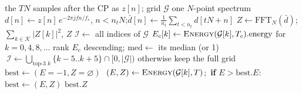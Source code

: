 \begin{algorithm}[H]
\caption{\textsc{Accumulate}, ROBUST and EXTREME: gated two-stage frequency search (\texttt{\_demodulate\_freq\_search}).}
\label{alg:acc_search}
\begin{algorithmic}[1]
\Require the $TN$ samples after the CP as $z[n]$; grid $\mathcal{G}$
\Ensure one $N$-point spectrum
 
    \State $d[n] \gets z[n]\, e^{-2\pi j f n / f_s}$, $n < n_t N$;\quad $\bar d[n] \gets \frac{1}{n_t}\sum_{t < n_t} d[tN + n]$
    \State $Z \gets \mathrm{FFT}_N(\bar d)$;\quad \Return $\sum_{k \in \mathcal{K}} |Z[k]|^2$, $Z$
\EndFunction
\State $\mathcal{I} \gets$ all indices of $\mathcal{G}$
 
    \State $E_c[k] \gets \textsc{Energy}(\mathcal{G}[k], T_c).\mathrm{energy}$ for $k = 0, 4, 8, \ldots$ 
    \State rank $E_c$ descending; $\mathrm{med} \gets$ its median (or 1)
     $\ \mathcal{I} \gets \bigcup_{\text{top-3 } k} \{k{-}5 .. k{+}5\} \cap [0, |\mathcal{G}|)$  \EndIf
    \Statex \hspace{\algorithmicindent} otherwise keep the full grid 
\EndIf
\State $\mathrm{best} \gets (E{=}-1, Z{=}\varnothing)$
 $\ (E, Z) \gets \textsc{Energy}(\mathcal{G}[k], T)$;\ \textbf{if} $E > \mathrm{best}.E$: $\mathrm{best} \gets (E, Z)$ \EndFor
\State \Return $\mathrm{best}.Z$
\end{algorithmic}
\end{algorithm}

